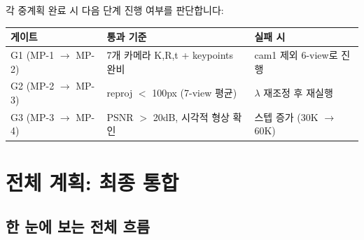 \documentclass[11pt, a4paper]{report}
\begin{document}
각 중계획 완료 시 다음 단계 진행 여부를 판단합니다:

\begin{center}
\renewcommand{\arraystretch}{1.3}
\begin{tabular}{lll}
\toprule
\textbf{게이트} & \textbf{통과 기준} & \textbf{실패 시} \\
\midrule
G1 (MP-1 $\to$ MP-2) & 7개 카메라 K,R,t + keypoints 완비 & cam1 제외 6-view로 진행 \\
G2 (MP-2 $\to$ MP-3) & reproj $<$ 100px (7-view 평균) & $\lambda$ 재조정 후 재실행 \\
G3 (MP-3 $\to$ MP-4) & PSNR $>$ 20dB, 시각적 형상 확인 & 스텝 증가 (30K $\to$ 60K) \\
\bottomrule
\end{tabular}
\end{center}


\chapter{전체 계획: 최종 통합}

\section{한 눈에 보는 전체 흐름}
\end{document}
